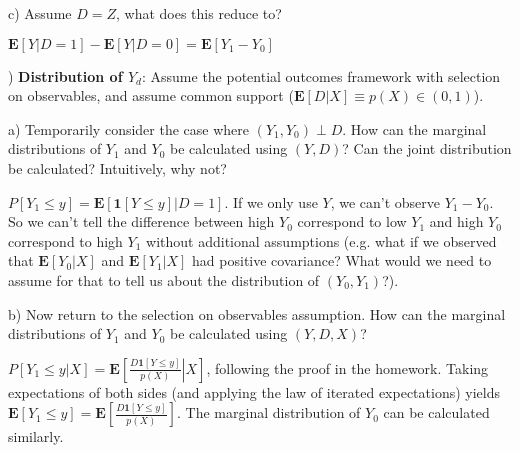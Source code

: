 \documentclass[12pt,english]{article}
\begin{document}
\vspace{1em}
c) Assume $D = Z$, what does this reduce to?
\vspace{1em}

$\mathbf{E}[Y | D = 1] - \mathbf{E}[Y | D = 0] = \mathbf{E}[Y_{1} - Y_{0}]$

\vspace{1em}
) \textbf{Distribution of $Y_{d}$}: Assume the potential outcomes framework with selection on observables, and assume common support ($\mathbf{E}[D | X] \equiv p(X) \in (0, 1)$).

a) Temporarily consider the case where $(Y_{1}, Y_{0}) \perp D$. How can the marginal distributions of $Y_{1}$ and $Y_{0}$ be calculated using $(Y, D)$? Can the joint distribution be calculated? Intuitively, why not?
\vspace{1em}

$P[Y_{1} \leq y] = \mathbf{E}[\mathbf{1}[Y \leq y] | D = 1]$. If we only use $Y$, we can't observe $Y_{1} - Y_{0}$. So we can't tell the difference between high $Y_{0}$ correspond to low $Y_{1}$ and high $Y_{0}$ correspond to high $Y_{1}$ without additional assumptions (e.g. what if we observed that $\mathbf{E}[Y_{0} | X]$ and $\mathbf{E}[Y_{1} | X]$ had positive covariance? What would we need to assume for that to tell us about the distribution of $(Y_{0}, Y_{1})$?).

\vspace{1em}
b) Now return to the selection on observables assumption. How can the marginal distributions of $Y_{1}$ and $Y_{0}$ be calculated using $(Y, D, X)$?
\vspace{1em}

$P[Y_{1} \leq y | X] = \mathbf{E} \left[ \left. \frac{D \mathbf{1}[Y \leq y]}{p(X)} \right| X \right]$, following the proof in the homework. Taking expectations of both sides (and applying the law of iterated expectations) yields $\mathbf{E}[Y_{1} \leq y] = \mathbf{E} \left[ \frac{D \mathbf{1}[Y \leq y]}{p(X)} \right]$. The marginal distribution of $Y_{0}$ can be calculated similarly.
\end{document}
